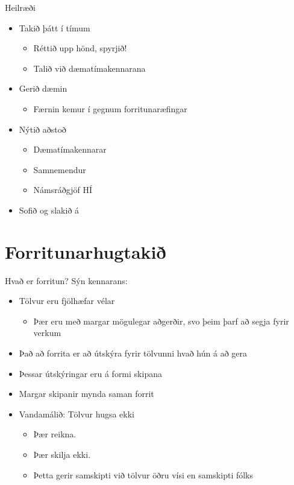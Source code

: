 \documentclass[handout]{beamer}
\begin{document}
\begin{frame}{Heilræði}
\pause
\begin{itemize}
 \item Takið þátt í tímum\pause
 \begin{itemize}
  \item Réttið upp hönd, spyrjið! \pause
  \item Talið við dæmatímakennarana
 \end{itemize}
 \item Gerið dæmin \pause
 \begin{itemize}
  \item Færnin kemur í gegnum forritunaræfingar \pause
 \end{itemize}
 \item Nýtið aðstoð
 \begin{itemize}
  \item Dæmatímakennarar
  \item Samnemendur
  \item Námsráðgjöf HÍ \pause
 \end{itemize}
 \item Sofið og slakið á
\end{itemize}
\end{frame}

\section{Forritunarhugtakið}

\begin{frame}{Hvað er forritun?}
\pause
Sýn kennarans:
\begin{itemize}
  \item Tölvur eru fjölhæfar vélar
  \begin{itemize}
   \item Þær eru með margar mögulegar aðgerðir, svo þeim þarf að segja fyrir verkum
  \end{itemize}
  \item Það að forrita er að útskýra fyrir tölvunni hvað hún á að gera
  \item Þessar útskýringar eru á formi skipana
  \item Margar skipanir mynda saman forrit
  \item Vandamálið: Tölvur hugsa ekki
  \begin{itemize}
   \item Þær reikna.
   \item Þær skilja ekki.
   \item Þetta gerir samskipti við tölvur öðru vísi en samskipti fólks
  \end{itemize}
 \end{itemize}
\end{frame}
\end{document}
